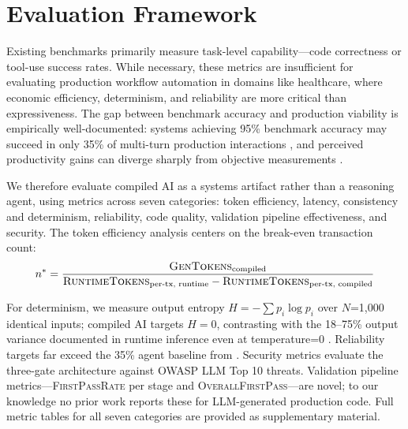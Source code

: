 \documentclass[11pt]{article}
\newcommand{\metric}[1]{\textsc{#1}}
\begin{document}
\section{Evaluation Framework}
\label{sec:framework}

Existing benchmarks primarily measure task-level capability---code correctness or tool-use success rates. While necessary, these metrics are insufficient for evaluating production workflow automation in domains like healthcare, where economic efficiency, determinism, and reliability are more critical than expressiveness. The gap between benchmark accuracy and production viability is empirically well-documented: systems achieving 95\% benchmark accuracy may succeed in only 35\% of multi-turn production interactions \citep{salesforce2025agents}, and perceived productivity gains can diverge sharply from objective measurements \citep{metr2025productivity}.

We therefore evaluate compiled AI as a systems artifact rather than a reasoning agent, using metrics across seven categories: token efficiency, latency, consistency and determinism, reliability, code quality, validation pipeline effectiveness, and security. The token efficiency analysis centers on the break-even transaction count:
\begin{equation}
n^* = \frac{\text{\metric{GenTokens}}_{\text{compiled}}}{\text{\metric{RuntimeTokens}}_{\text{per-tx, runtime}} - \text{\metric{RuntimeTokens}}_{\text{per-tx, compiled}}}
\end{equation}

For determinism, we measure output entropy $H = -\sum p_i \log p_i$ over $N$=1,000 identical inputs; compiled AI targets $H = 0$, contrasting with the 18--75\% output variance documented in runtime inference even at temperature=0 \citep{ouyang2023nondeterminism}. Reliability targets far exceed the 35\% agent baseline from \citet{salesforce2025agents}. Security metrics evaluate the three-gate architecture against OWASP LLM Top 10 threats. Validation pipeline metrics---\metric{FirstPassRate} per stage and \metric{OverallFirstPass}---are novel; to our knowledge no prior work reports these for LLM-generated production code. Full metric tables for all seven categories are provided as supplementary material.

\end{document}
